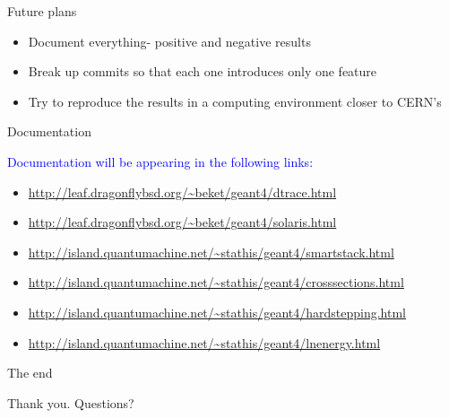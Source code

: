 \documentclass{beamer}
\begin{document}
\begin{frame}{Future plans}

\begin{itemize}
\item Document everything- positive and negative results
\item Break up commits so that each one introduces only one feature
\item Try to reproduce the results in a computing environment closer to CERN's
\end{itemize}
\end{frame}

\def\UrlFont{\scriptsize\ttfamily}
\begin{frame}{Documentation}

\textcolor{blue}{Documentation will be appearing in the following links:}

\begin{itemize}
\item \url{http://leaf.dragonflybsd.org/~beket/geant4/dtrace.html}
\item \url{http://leaf.dragonflybsd.org/~beket/geant4/solaris.html}
\end{itemize}

\vspace{5mm}

\begin{itemize}
\item \url{http://island.quantumachine.net/~stathis/geant4/smartstack.html}
\item \url{http://island.quantumachine.net/~stathis/geant4/crosssections.html}
\item \url{http://island.quantumachine.net/~stathis/geant4/hardstepping.html}
\item \url{http://island.quantumachine.net/~stathis/geant4/lnenergy.html}
\end{itemize}
\end{frame}

\begin{frame}{The end}
\vspace*{\fill}
\begin{center}
Thank you. Questions?
\end{center}
\vspace*{\fill}
\end{frame}
\end{document}
